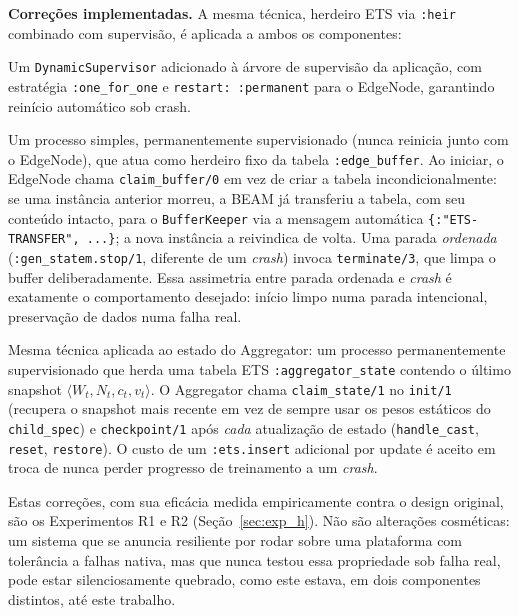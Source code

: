 \documentclass[conference,a4paper]{IEEEtran}
\begin{document}
\textbf{Correções implementadas.} A mesma técnica, herdeiro ETS via
\texttt{:heir} combinado com supervisão, é aplicada a ambos os componentes:

\begin{description}[leftmargin=*,noitemsep]
  \item[\texttt{AFL.EdgeNodeSupervisor}] Um \texttt{DynamicSupervisor}
    adicionado à árvore de supervisão da aplicação, com estratégia
    \texttt{:one\_for\_one} e \texttt{restart: :permanent} para o EdgeNode,
    garantindo reinício automático sob crash.
  \item[\texttt{AFL.BufferKeeper}] Um processo simples, permanentemente
    supervisionado (nunca reinicia junto com o EdgeNode), que atua como
    herdeiro fixo da tabela \texttt{:edge\_buffer}. Ao iniciar, o EdgeNode
    chama \texttt{claim\_buffer/0} em vez de criar a tabela
    incondicionalmente: se uma instância anterior morreu, a BEAM já
    transferiu a tabela, com seu conteúdo intacto, para o
    \texttt{BufferKeeper} via a mensagem automática
    \texttt{\{:"ETS-TRANSFER", ...\}}; a nova instância a reivindica de
    volta. Uma parada \emph{ordenada} (\texttt{:gen\_statem.stop/1},
    diferente de um \textit{crash}) invoca \texttt{terminate/3}, que limpa
    o buffer deliberadamente. Essa assimetria entre parada ordenada e
    \textit{crash} é exatamente o comportamento desejado: início limpo
    numa parada intencional, preservação de dados numa falha real.
  \item[\texttt{AFL.ModelKeeper}] Mesma técnica aplicada ao estado do
    Aggregator: um processo permanentemente supervisionado que herda uma
    tabela ETS \texttt{:aggregator\_state} contendo o último snapshot
    $\langle W_t, N_t, c_t, v_t\rangle$. O Aggregator chama
    \texttt{claim\_state/1} no \texttt{init/1} (recupera o snapshot mais
    recente em vez de sempre usar os pesos estáticos do
    \texttt{child\_spec}) e \texttt{checkpoint/1} após \emph{cada}
    atualização de estado (\texttt{handle\_cast}, \texttt{reset},
    \texttt{restore}). O custo de um \texttt{:ets.insert} adicional por
    update é aceito em troca de nunca perder progresso de treinamento a um
    \textit{crash}.
\end{description}

Estas correções, com sua eficácia medida empiricamente contra o design
original, são os Experimentos R1 e R2 (Seção~\ref{sec:exp_h}). Não são
alterações cosméticas: um sistema que se anuncia resiliente por rodar
sobre uma plataforma com tolerância a falhas nativa, mas que nunca testou
essa propriedade sob falha real, pode estar silenciosamente quebrado, como
este estava, em dois componentes distintos, até este trabalho.
\end{document}
